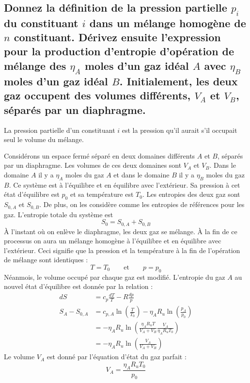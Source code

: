 \subsection{Donnez la définition de la pression partielle $p_i$ du constituant $i$ dans un mélange homogène de $n$ constituant. Dérivez ensuite l'expression pour la production d'entropie d'opération de mélange des $\eta_A$ moles d'un gaz idéal $A$ avec $\eta_B$ moles d'un gaz idéal $B$. Initialement, les deux gaz occupent des volumes différents, $V_A$ et $V_B$, séparés par un diaphragme.}
La pression partielle d'un constituant $i$ est la pression qu'il aurait s'il occupait seul le volume du mélange.

Considérons un espace fermé séparé en deux domaines différents $A$ et $B$, séparés par un diaphragme. Les volumes de ces deux domaines sont $V_A$ et $V_B$. Dans le domaine $A$ il y a $\eta_A$ moles du gaz $A$ et dans le domaine $B$ il y a $\eta_B$ moles du gaz $B$. Ce système est à l'équilibre et en équilibre avec l'extérieur. Sa pression à cet état d'équilibre est $p_0$ et sa température est $T_0$. Les entropies des deux gaz sont $S_{0,A}$ et $S_{0,B}$. De plus, on les considère comme les entropies de références pour les gaz. L'entropie totale du système est 
\begin{equation} S_0 = S_{0,A} + S_{0,B} \end{equation}
À l'instant où on enlève le diaphragme, les deux gaz se mélange. À la fin de ce processus on aura un mélange homogène à l'équilibre et en équilibre avec l'extérieur. Ceci signifie que la pression et la température à la fin de l'opération de mélange sont identiques :
\begin{equation} T = T_0 \qquad \text{et} \qquad p = p_0 \end{equation}
Néanmois, le volume occupé par chaque gaz est modifié. L'entropie du gaz $A$ au nouvel état d'équilibre est donnée par la relation :
\begin{align} dS &= c_p\frac{dT}{T} - R\frac{dp}{p} \\ S_A - S_{0,A} &= c_{p,A}\ln\left(\frac{T}{T_0}\right) - \eta_AR_u\ln\left(\frac{p_A}{p_0}\right) \\ &= -\eta_AR_u\ln\left(\frac{\eta_AR_uT}{V_A + V_B}\frac{V_A}{\eta_AR_uT_0}\right) \\ &= -\eta_AR_u\ln\left(\frac{V_A}{V_A+V_B}\right) \end{align}
Le volume $V_A$ est donné par l'équation d'état du gaz parfait :
\begin{equation} V_A = \frac{\eta_AR_uT_0}{p_0} \end{equation}
